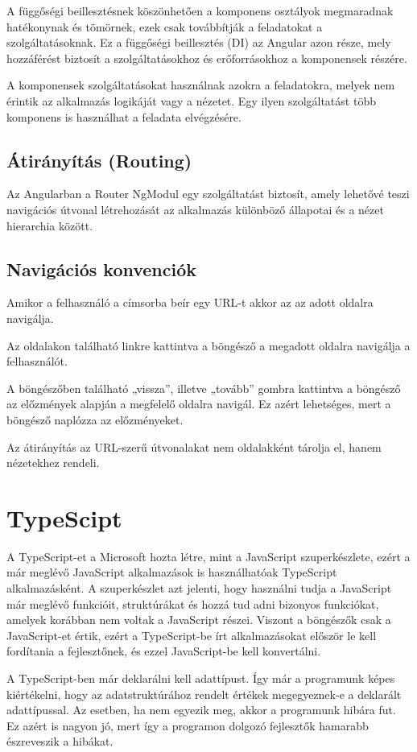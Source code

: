 A függőségi beillesztésnek köszönhetően a komponens osztályok megmaradnak hatékonynak és tömörnek, ezek csak továbbítják a feladatokat a szolgáltatásoknak. Ez a függőségi beillesztés (DI) az Angular azon része, mely hozzáférést biztosít a szolgáltatásokhoz és erőforrásokhoz a komponensek részére.

A komponensek szolgáltatásokat használnak azokra a feladatokra, melyek nem érintik az alkalmazás logikáját vagy a nézetet. Egy ilyen szolgáltatást több komponens is használhat a feladata elvégzésére.

\subsection{Átirányítás (Routing)}
Az Angularban a Router NgModul egy szolgáltatást biztosít, amely lehetővé teszi navigációs útvonal létrehozását az alkalmazás különböző állapotai és a nézet hierarchia között.
\subsection{Navigációs konvenciók}
Amikor a felhasználó a címsorba beír egy URL-t akkor az az adott oldalra navigálja.

Az oldalakon található linkre kattintva a böngésző a megadott oldalra navigálja a felhasználót.

A böngészőben található „vissza”, illetve „tovább” gombra kattintva a böngésző az előzmények alapján a megfelelő oldalra navigál. Ez azért lehetséges, mert a böngésző naplózza az előzményeket.

Az átirányítás az URL-szerű útvonalakat nem oldalakként tárolja el, hanem nézetekhez rendeli.


\section{TypeScipt}
A TypeScript-et \cite{6} a Microsoft hozta létre, mint a JavaScript szuperkészlete, ezért a már meglévő JavaScript alkalmazások is használhatóak TypeScript alkalmazásként. A szuperkészlet azt jelenti, hogy használni tudja a JavaScript már meglévő funkcióit, struktúrákat és hozzá tud adni bizonyos funkciókat, amelyek korábban nem voltak a JavaScript részei. Viszont a böngészők csak a JavaScript-et értik, ezért a TypeScript-be írt alkalmazásokat először le kell fordítania a fejlesztőnek, és ezzel JavaScript-be kell konvertálni.

A TypeScript-ben már deklarálni kell adattípust. Így már a programunk képes kiértékelni, hogy az adatstruktúrához rendelt értékek megegyeznek-e a deklarált adattípussal. Az esetben, ha nem egyezik meg, akkor a programunk hibára fut. Ez azért is nagyon jó, mert így a programon dolgozó fejlesztők hamarabb észreveszik a hibákat.

